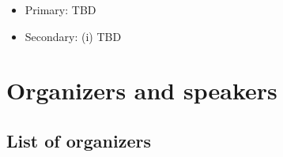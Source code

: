 \documentclass{article}
\newcommand{\cYoshi}[1]{{\color{cyan}{#1}}} %
\def\c#1{\textcolor{gray}{#1}}
\begin{document}
\cYoshi{This section is still TBD. Yoshi will update very soon!}

\begin{itemize}
\item Primary: TBD
\item Secondary: (i) TBD
\end{itemize}

\section{Organizers and speakers}
\subsection{List of organizers}
\end{document}
